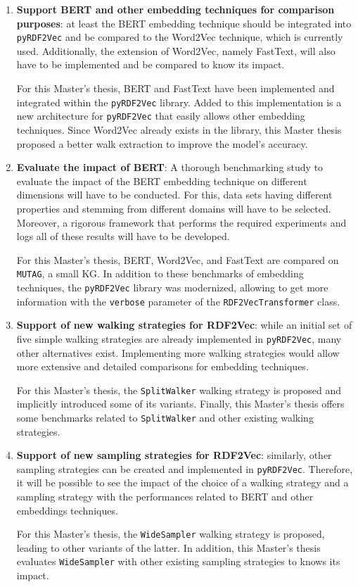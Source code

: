 \begin{enumerate}
\item \textbf{Support BERT and other embedding techniques for comparison
purposes}: at least the BERT embedding technique should be integrated into
\texttt{pyRDF2Vec} and be compared to the Word2Vec technique, which is currently
used. Additionally, the extension of Word2Vec, namely FastText, will also have
to be implemented and be compared to know its impact.

For this Master's thesis, BERT and FastText have been implemented and integrated
within the \texttt{pyRDF2Vec} library. Added to this implementation is a new
architecture for \texttt{pyRDF2Vec} that easily allows other embedding
techniques. Since Word2Vec already exists in the library, this Master thesis
proposed a better walk extraction to improve the model's accuracy.

\item \textbf{Evaluate the impact of BERT}: A thorough benchmarking study to
evaluate the impact of the BERT embedding technique on different dimensions will
have to be conducted. For this, data sets having different properties and
stemming from different domains will have to be selected. Moreover, a rigorous
framework that performs the required experiments and logs all of these results
will have to be developed.

For this Master's thesis, BERT, Word2Vec, and FastText are compared on
\texttt{MUTAG}, a small KG. In addition to these benchmarks of embedding
techniques, the \texttt{pyRDF2Vec} library was modernized, allowing to get more
information with the \texttt{verbose} parameter of the
\texttt{RDF2VecTransformer} class.

\newpage

\item \textbf{Support of new walking strategies for RDF2Vec}: while an initial
set of five simple walking strategies are already implemented in
\texttt{pyRDF2Vec}, many other alternatives exist. Implementing more walking
strategies would allow more extensive and detailed comparisons for embedding
techniques.

For this Master's thesis, the \texttt{SplitWalker} walking strategy is proposed and
implicitly introduced some of its variants. Finally, this Master's thesis offers
some benchmarks related to \texttt{SplitWalker} and other existing walking strategies.

\item \textbf{Support of new sampling strategies for RDF2Vec}: similarly, other
sampling strategies can be created and implemented in
\texttt{pyRDF2Vec}. Therefore, it will be possible to see the impact of the
choice of a walking strategy and a sampling strategy with the performances
related to BERT and other embeddings techniques.

For this Master's thesis, the \texttt{WideSampler} walking strategy is proposed,
leading to other variants of the latter. In addition, this Master's thesis
evaluates \texttt{WideSampler} with other existing sampling strategies to knows
its impact.
\end{enumerate}

